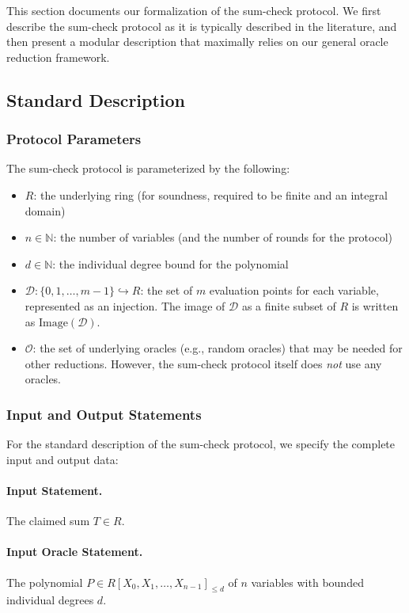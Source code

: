 This section documents our formalization of the sum-check protocol.
We first describe the sum-check protocol as it is typically described in the literature, and then
present a modular description that maximally relies on our general oracle reduction framework.

\subsection{Standard Description}\label{sec:sumcheck_standard}

\subsubsection{Protocol Parameters}

The sum-check protocol is parameterized by the following:
\begin{itemize}
    \item $R$: the underlying ring (for soundness, required to be finite and an integral domain)
    \item $n \in \mathbb{N}$: the number of variables (and the number of rounds for the protocol)
    \item $d \in \mathbb{N}$: the individual degree bound for the polynomial
    \item $\mathcal{D}: \{0, 1, \ldots, m-1\} \hookrightarrow R$: the set of $m$ evaluation points for each variable, represented as an injection. The image of $\mathcal{D}$ as a finite subset of $R$ is written as $\text{Image}(\mathcal{D})$.
    \item $\mathcal{O}$: the set of underlying oracles (e.g., random oracles) that may be needed for other reductions. However, the sum-check protocol itself does \emph{not} use any oracles.
\end{itemize}

\subsubsection{Input and Output Statements}

For the standard description of the sum-check protocol, we specify the complete input and output data:

\paragraph{Input Statement.} The claimed sum $T \in R$.

\paragraph{Input Oracle Statement.} The polynomial $P \in R[X_0, X_1, \ldots, X_{n-1}]_{\leq d}$ of $n$ variables with bounded individual degrees $d$.

